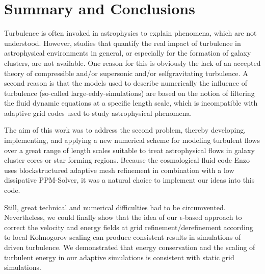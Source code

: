 \chapter{Summary and Conclusions}\label{summ}
Turbulence is often invoked in astrophysics to explain phenomena, which are
not understood. However, studies that quantify the real impact of 
turbulence in astrophysical environments in general, or especially for the
formation of galaxy clusters, are not available. One reason for this is
obviously the lack of an accepted theory of compressible and/or supersonic
and/or
selfgravitating turbulence. A second reason is that the models used to
describe numerically the influence of turbulence (so-called 
large-eddy-simulations) are based on the notion of
filtering the fluid dynamic equations at a specific length scale, which is
incompatible with adaptive grid codes used to study astrophysical phenomena.

The aim of this work was to address the second problem, thereby developing,
implementing, and applying a new numerical scheme for modeling turbulent flows
over a great range of length scales suitable to treat astrophysical flows in
galaxy cluster cores or star forming regions. Because the cosmological fluid
code Enzo uses blockstructured adaptive mesh refinement in combination with
a low dissipative PPM-Solver, it was a natural choice to implement our ideas
into this code.

Still, great technical and numerical difficulties had to be circumvented.
Nevertheless, we could finally show that the
idea of our $\epsilon$-based approach to correct the velocity and energy fields
at grid refinement/derefinement according to local Kolmogorov scaling can
produce consistent results in simulations of driven turbulence. We demonstrated
that energy conservation and the scaling of turbulent energy in our adaptive
simulations is consistent with static grid simulations. 

